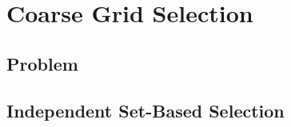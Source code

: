 \documentclass{elsart}
\begin{document}
\section{Coarse Grid Selection}
\label{sec:coarse-grid-select}

\subsection{Problem}
\label{sec:problem}

\subsection{Independent Set-Based Selection}
\label{sec:indep-set-based}
\end{document}
